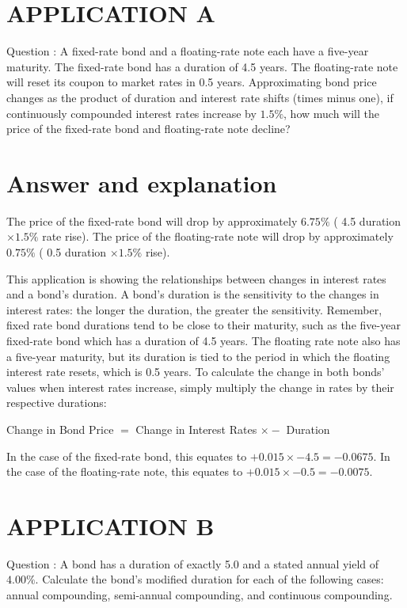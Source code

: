 \documentclass[11pt]{article}
\begin{document}
\section*{APPLICATION A}
Question : A fixed-rate bond and a floating-rate note each have a five-year maturity. The fixed-rate bond has a duration of 4.5 years. The floating-rate note will reset its coupon to market rates in 0.5 years. Approximating bond price changes as the product of duration and interest rate shifts (times minus one), if continuously compounded interest rates increase by $1.5 \%$, how much will the price of the fixed-rate bond and floating-rate note decline?

\section*{Answer and explanation}
The price of the fixed-rate bond will drop by approximately $6.75 \%$ ( 4.5 duration $\times 1.5 \%$ rate rise). The price of the floating-rate note will drop by approximately $0.75 \%$ ( 0.5 duration $\times 1.5 \%$ rise).

This application is showing the relationships between changes in interest rates and a bond's duration. A bond's duration is the sensitivity to the changes in interest rates: the longer the duration, the greater the sensitivity. Remember, fixed rate bond durations tend to be close to their maturity, such as the five-year fixed-rate bond which has a duration of 4.5 years. The floating rate note also has a five-year maturity, but its duration is tied to the period in which the floating interest rate resets, which is 0.5 years. To calculate the change in both bonds' values when interest rates increase, simply multiply the change in rates by their respective durations:

Change in Bond Price $=$ Change in Interest Rates $\times-$ Duration

In the case of the fixed-rate bond, this equates to $+0.015 \times-4.5=-0.0675$. In the case of the floating-rate note, this equates to $+0.015 \times-0.5=-0.0075$.

\section*{APPLICATION B}
Question : A bond has a duration of exactly 5.0 and a stated annual yield of $4.00 \%$. Calculate the bond's modified duration for each of the following cases: annual compounding, semi-annual compounding, and continuous compounding.
\end{document}
